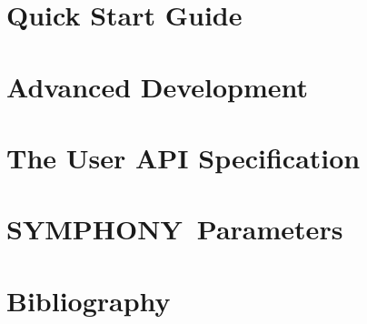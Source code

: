 \documentclass[twoside,11pt]{article}
\newcommand{\BB}{{\sc SYMPHONY}}
\begin{document}
\newpage

\tableofcontents

\newpage

\setcounter{page}{1}



\section{Quick Start Guide}
\label{getting_started}


\section{Advanced Development}
\label{development}


\newpage


%

\section{The User API Specification}
\label{API}
\sloppy


\newpage



\newpage



\newpage








%

%

%

%

%

%


\section{\BB\ Parameters}
\label{params}


\newpage

\section{Bibliography}




%
\end{document}
